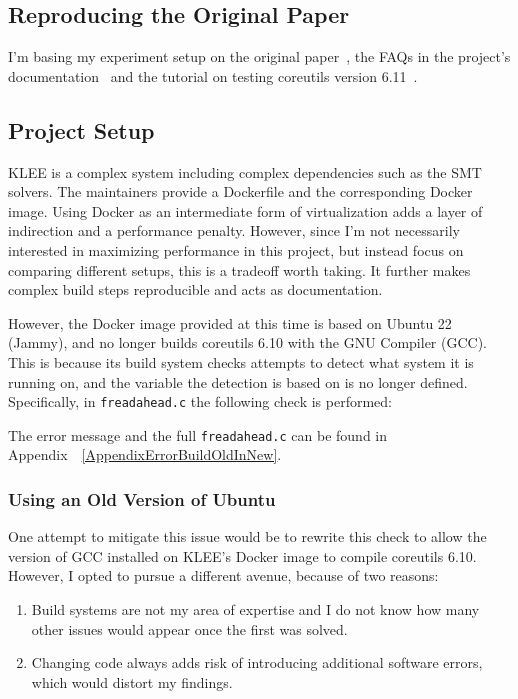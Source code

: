 \documentclass{article}
\let\savedCite=\cite
\renewcommand{\cite}{\unskip~\savedCite}
\let\savedRef=\ref
\renewcommand{\ref}{\unskip~\savedRef}
\begin{document}
\begin{multicols}{2}
    \section{Reproducing the Original Paper}
    \label{Reproducing}
    I'm basing my experiment setup on the original paper\cite{KLEE}, the FAQs in the project's documentation\cite{KLEEFAQ} and the tutorial on testing coreutils version 6.11\cite{KLEETutorial}.

    \subsection{Project Setup}
    KLEE is a complex system including complex dependencies such as the SMT solvers. The maintainers provide a Dockerfile and the corresponding Docker image. Using Docker as an intermediate form of virtualization adds a layer of indirection and a performance penalty. However, since I'm not necessarily interested in maximizing performance in this project, but instead focus on comparing different setups, this is a tradeoff worth taking. It further makes complex build steps reproducible and acts as documentation.

    However, the Docker image provided at this time is based on Ubuntu 22 (Jammy), and no longer builds coreutils 6.10 with the GNU Compiler (GCC). This is because its build system checks attempts to detect what system it is running on, and the variable the detection is based on is no longer defined. Specifically, in \lstinline{freadahead.c} the following check is performed:

    

    The error message and the full \lstinline{freadahead.c} can be found in Appendix~\ref{AppendixErrorBuildOldInNew}.

    \subsubsection{Using an Old Version of Ubuntu}
    \label{OldVersion}

    One attempt to mitigate this issue would be to rewrite this check to allow the version of GCC installed on KLEE's Docker image to compile coreutils 6.10. However, I opted to pursue a different avenue, because of two reasons:
    \begin{enumerate}
        \item Build systems are not my area of expertise and I do not know how many other issues would appear once the first was solved.
        \item Changing code always adds risk of introducing additional software errors, which would distort my findings.
    \end{enumerate}


\end{multicols}
\end{document}
